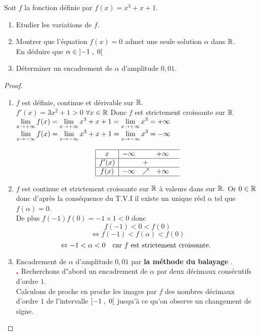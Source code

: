 \begin{exercice}
Soit $ f $ la fonction définie par $ f(x)= x^{3}+x+1 $.
 \begin{enumerate}
\item Etudier les variations  de $ f $.
\item Montrer que  l'équation $ f(x)=0 $ admet une seule solution $ \alpha$ dans $\mathbb{R} $.\\ En déduire que $ \alpha\in\left]-1 \;,\; 0\right[ $
\item  Déterminer un encadrement de $ \alpha $ d'amplitude $ 0,01 $.
\end{enumerate}
\end{exercice}
\begin{proof}
 \begin{enumerate}
\item $ f $ est définie, continue et dérivable sur $ \mathbb{R}. $\\
$ f'(x) = 3x^{2}+1 > 0$  $\forall x\in \mathbb{R} $ Donc $ f $ est strictement croissante  sur $ \mathbb{R} $ \\
$ \displaystyle\lim_{x \to +\infty}f(x)=\displaystyle \lim_{x \to +\infty}x^{3}+x+1=\displaystyle\lim_{x \to +\infty}x^{3}=+\infty$\\
$\displaystyle \lim_{x \to -\infty}f(x)=\displaystyle \lim_{x \to -\infty}x^{3}+x+1=\displaystyle\lim_{x \to -\infty}x^{3}=-\infty$

$$
\begin{array}{|c|cccc}
\hline
x & -\infty & & +\infty & \\
\hline
f'(x) & & + & & \\
\hline
f(x) & -\infty & \nearrow & +\infty & \\
\hline
\end{array}
$$

\item $ f $ est continue et strictement croissante sur $ \mathbb{R}$ à valeurs dans sur $ \mathbb{R}. $ Or $ 0\in \mathbb{R} $ donc d'après la conséquence  du T.V.I il existe un unique réel $ \alpha $ tel que $ f(\alpha)=0 $.\\ De plus $ f(-1)f(0)=-1\times 1 < 0$ donc $$  f(-1)<0<f(0) $$ $$ \Leftrightarrow f(-1)<f(\alpha)<f(0) $$ $$ \Leftrightarrow -1<\alpha< 0 \quad \textrm{car $ f $ est strictement croissante. }$$
\item Encadrement de $ \alpha $ d'amplitude $ 0,01 $ par \textbf{la méthode du balayage }.\\
$ \color{red}\centerdot $ Recherchons d"abord un encadrement de $ \alpha $ par deux décimaux consécutifs d'ordre $ 1. $\\
Calculons de proche en proche les images par $ f $  des nombres décimaux d'ordre $ 1 $ de l'intervalle $ \left[-1 \;,\; 0\right[ $ jusqu'à ce qu'on observe un changement de signe.



\end{enumerate}
\end{proof}
